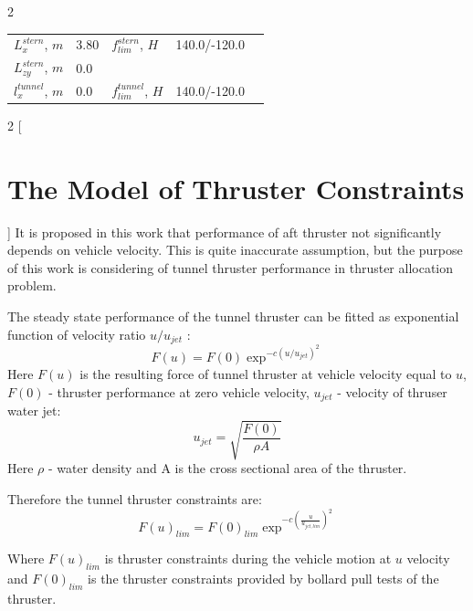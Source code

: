 \documentclass[a0,portrait]{a0poster}
\begin{document}
\begin{minipage}[t]{0.48\linewidth}
\begin{multicols}{2}
\begin{center}
\begin{tabular}{l l l l l}
\toprule
$L_{x}^{stern}$,  $m$ & 3.80 & $f_{lim}^{stern}$, $H$ & 140.0/-120.0 \\
$L_{zy}^{stern}$, $m$ & 0.0  & 																 &      \\
$l_x^{tunnel}$,   $m$ & 0.0  & $f_{lim}^{tunnel}$, $H$ & 140.0/-120.0\\
\bottomrule
\end{tabular}
\label{table:propulsion}
\end{center}\vspace{1cm}

\end{multicols}
\end{minipage}
\hfill
\begin{minipage}[t]{0.48\linewidth}
\begin{multicols}{2}
[
\section*{The Model of Thruster Constraints}
]
It is proposed in this work that performance of aft thruster not significantly depends on vehicle velocity. This is quite inaccurate assumption, but the purpose of this work is considering of tunnel thruster performance in thruster allocation problem.

The steady state performance of the tunnel thruster can be fitted as exponential function of velocity ratio $u/u_{jet}$ \cite{thruster_tunnel}:
\begin{equation*}
	F(u) = F(0)\exp^{-c(u/u_{jet})^2}
\end{equation*}
Here $F(u)$ is the resulting force of tunnel thruster at vehicle velocity equal to $u$, $F(0)$ - thruster performance at zero vehicle velocity, $u_{jet}$ - velocity of thruser water jet:
\begin{equation*}
	u_{jet} = \sqrt{\frac{F(0)}{\rho A}}
\end{equation*}
Here $\rho$ - water density and A is the cross sectional area of the thruster.

Therefore the tunnel thruster constraints are:
\begin{equation}
	F(u)_{lim} = F(0)_{lim}\exp^{-c(\frac{u}{u_{jet,lim}})^2}
\label{eq:constraints}
\end{equation}

Where $F(u)_{lim}$ is thruster constraints during the vehicle motion at $u$ velocity and $F(0)_{lim}$ is the thruster constraints provided by bollard pull tests of the thruster.

\end{multicols}
\end{minipage}
\end{document}
